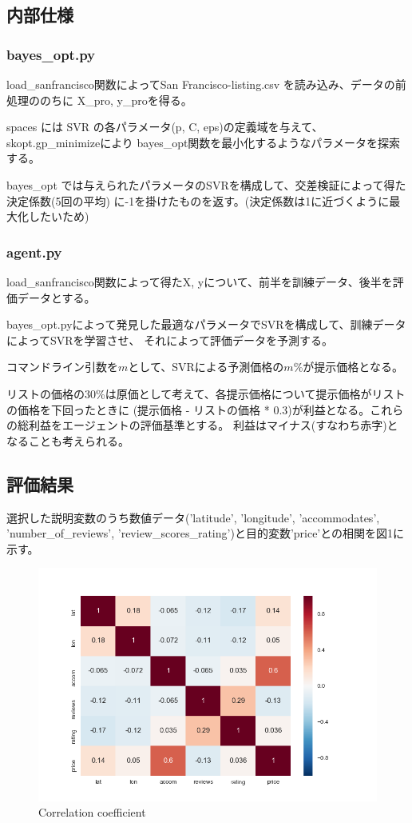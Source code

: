 \documentclass{jsarticle}
\begin{document}
\subsection{内部仕様}
\subsubsection*{bayes\_opt.py}
load\_sanfrancisco関数によってSan Francisco-listing.csv を読み込み、データの前処理ののちに
X\_pro, y\_proを得る。

spaces には SVR の各パラメータ(p, C, eps)の定義域を与えて、skopt.gp\_minimizeにより
bayes\_opt関数を最小化するようなパラメータを探索する。

bayes\_opt では与えられたパラメータのSVRを構成して、交差検証によって得た決定係数(5回の平均)
に-1を掛けたものを返す。(決定係数は1に近づくように最大化したいため)

\subsubsection*{agent.py}
load\_sanfrancisco関数によって得たX, yについて、前半を訓練データ、後半を評価データとする。

bayes\_opt.pyによって発見した最適なパラメータでSVRを構成して、訓練データによってSVRを学習させ、
それによって評価データを予測する。

コマンドライン引数を$m$として、SVRによる予測価格の$m$\%が提示価格となる。

リストの価格の30\%は原価として考えて、各提示価格について提示価格がリストの価格を下回ったときに
(提示価格 - リストの価格 * 0.3)が利益となる。これらの総利益をエージェントの評価基準とする。
利益はマイナス(すなわち赤字)となることも考えられる。

\subsection{評価結果}
選択した説明変数のうち数値データ('latitude', 'longitude', 'accommodates', 'number\_of\_reviews',
'review\_scores\_rating')と目的変数'price'との相関を図1に示す。
\begin{figure}[H]
\includegraphics[width=15cm]{corr.png}
\caption{Correlation coefficient}
\end{figure}
\end{document}
